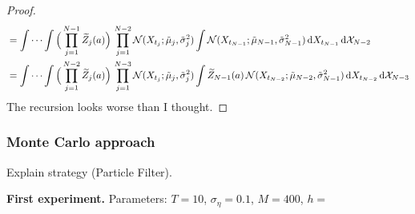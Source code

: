\documentclass[10pt]{article}
\begin{document}
\begin{proof}
\begin{equation}
\begin{aligned}
		&=  \int \cdots \int \Big(\prod_{j=1}^{N-1} \widetilde Z_j(a)\Big) \,  \prod_{j=1}^{N-2} \mathcal N(X_{t_j}; \tilde \mu_j, \tilde \sigma_j^2) \int \mathcal N(X_{t_{N-1}}; \tilde \mu_{N-1}, \tilde \sigma_{N-1}^2) \, \mathrm{d} X_{t_{N-1}} \, \mathrm{d} \mathcal X_{N-2} \\
		&=  \int \cdots \int \Big(\prod_{j=1}^{N-2} \widetilde Z_j(a)\Big) \,  \prod_{j=1}^{N-3} \mathcal N(X_{t_j}; \tilde \mu_j, \tilde \sigma_j^2) \int \widetilde Z_{N-1}(a) \, \mathcal N(X_{t_{N-2}}; \tilde \mu_{N-2}, \tilde \sigma_{N-1}^2) \, \mathrm{d} X_{t_{N-2}} \, \mathrm{d} \mathcal X_{N-3} \\
	\end{aligned}
	\end{equation}
	{\color{red} The recursion looks worse than I thought.}
\end{proof}

\subsubsection*{Monte Carlo approach}

Explain strategy (Particle Filter).

\textbf{First experiment.} Parameters: $T = 10$, $\sigma_\eta = 0.1$, $M = 400$, $h = $



\end{document}
